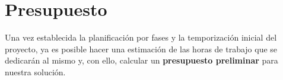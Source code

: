 %	
%	
%	
%
%
%	
%	
%	
%	
%	
%	
%	
%

\section{Presupuesto}

Una vez establecida la planificación por fases y la temporización inicial del proyecto, ya es posible hacer una estimación de las horas de trabajo que se dedicarán al mismo y, con ello, calcular un \textbf{presupuesto preliminar} para nuestra solución.

